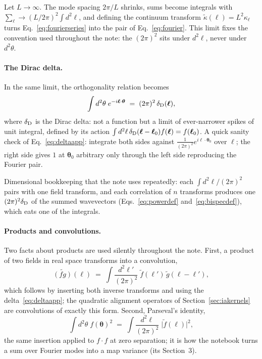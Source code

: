 \documentclass[11pt]{article}
\newcommand{\btheta}{\boldsymbol{\theta}}
\newcommand{\bell}{\boldsymbol{\ell}}
\numberwithin{equation}{section}
\begin{document}
Let $L \to \infty$.  The mode spacing $2\pi/L$ shrinks, sums become
integrals with $\sum_{\bell} \to (L/2\pi)^2 \int d^2\ell$, and
defining the continuum transform
$\tilde\kappa(\bell) = L^2 \kappa_{\bell}$ turns
Eq.~\eqref{eq:fourierseries} into the pair of
Eq.~\eqref{eq:fourier}.  This limit fixes the convention used
throughout the note: the $(2\pi)^2$ sits under $d^2\ell$, never
under $d^2\theta$.

\paragraph{The Dirac delta.}
In the same limit, the orthogonality relation becomes
\begin{equation}
  \int d^2\theta\; e^{-i\bell\cdot\btheta}
  \;=\; (2\pi)^2\, \delta_{\rm D}(\bell) ,
  \label{eq:deltaapp}
\end{equation}
where $\delta_{\rm D}$ is the Dirac delta: not a function but a
limit of ever-narrower spikes of unit integral, defined by its
action $\int d^2\ell\, \delta_{\rm D}(\bell - \bell_0) f(\bell) =
f(\bell_0)$.  A quick sanity check of
Eq.~\eqref{eq:deltaapp}: integrate both sides against
$\frac{1}{(2\pi)^2}e^{i\bell\cdot\btheta_0}$ over $\bell$; the
right side gives $1$ at $\btheta_0$ arbitrary only through the left
side reproducing the Fourier pair.

Dimensional bookkeeping that the note uses repeatedly: each
$\int d^2\ell/(2\pi)^2$ pairs with one field transform, and each
correlation of $n$ transforms produces one
$(2\pi)^2\delta_{\rm D}$ of the summed wavevectors
(Eqs.~\eqref{eq:powerdef} and~\eqref{eq:bispecdef}), which eats one
of the integrals.

\paragraph{Products and convolutions.}
Two facts about products are used silently throughout the note.
First, a product of two fields in real space transforms into a
convolution,
\begin{equation}
  \widetilde{(fg)}(\bell)
  \;=\; \int \frac{d^2\ell'}{(2\pi)^2}\;
  \tilde f(\bell')\,\tilde g(\bell - \bell') ,
  \label{eq:convolution}
\end{equation}
which follows by inserting both inverse transforms and using the
delta~\eqref{eq:deltaapp}; the quadratic alignment operators of
Section~\ref{sec:iakernels} are convolutions of exactly this form.
Second, Parseval's identity,
\begin{equation}
  \int d^2\theta\; f(\btheta)^2
  \;=\; \int \frac{d^2\ell}{(2\pi)^2}\;
  \bigl|\tilde f(\bell)\bigr|^2 ,
  \label{eq:parseval}
\end{equation}
the same insertion applied to $f \cdot f$ at zero separation; it is
how the notebook turns a sum over Fourier modes into a map variance
(its Section~3).
\end{document}
